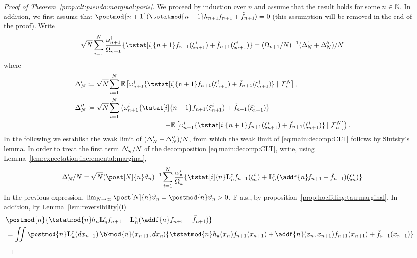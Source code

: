 \begin{proof}[Proof of Theorem~\ref{prop:clt:pseudo:marginal:paris}]
We proceed by induction over $n$ and assume that the result holds for some $n \in \mathbb{N}$. In addition, we first assume that $\postmod{n + 1}(\tstatmod{n + 1} h_{n + 1} f_{n + 1} + \ftd{n + 1}) = 0$ (this assumption will be removed in the end of the proof). Write
\begin{equation} \label{eq:main:decomp:CLT}
\sqrt{N} \sum_{i = 1}^\N \frac{\ewght{n + 1}{i}}{\sumwght{n + 1}}\{\tstat[i]{n + 1} f_{n + 1}(\epart{n + 1}{i}) +  \ftd{n + 1}(\epart{n + 1}{i})\} = (\sumwght{n + 1} / \N)^{-1} (\termprime + \termbis) / \N,
\end{equation}
where 
\begin{align*}
\termprime &\eqdef \sqrt{\N} \sum_{i = 1}^\N \pE \left[ \ewght{n + 1}{i}\{\tstat[i]{n + 1}f_{n + 1}(\epart{n + 1}{i}) + \ftd{n + 1}(\epart{n + 1}{i})\} \cond \calF{n}{\N} \right],\\
 \termbis &\eqdef \sqrt{\N} \sum_{i = 1}^N \left( \ewght{n+1}{i}\{\tstat[i]{n+1}f_{n+1}(\epart{n+1}{i}) + \ftd{n+1}(\epart{n+1}{i})\}\right.\\
&\left.\hspace{4cm} - \pE \left[\ewght{n+1}{i} \{ \tstat[i]{n+1} f_{n+1}(\epart{n+1}{i}) + \ftd{n+1}(\epart{n+1}{i})\} \cond \calF{n}{\N} \right] \right).
\end{align*}
In the following we establish the weak limit of $(\Delta_N^\prime + \Delta_N^{\prime \prime}) / N$, from which the weak limit of \eqref{eq:main:decomp:CLT} follows by Slutsky's lemma. In order to treat the first term $\Delta_N^\prime / N$ of the decomposition \eqref{eq:main:decomp:CLT}, write, using Lemma~\ref{lem:expectation:incremental:marginal},
\[
\termprime / \N = \sqrt{\N} (\post[\N]{n} \adjfuncforward{n})^{-1} \sum_{i = 1}^N \frac{\ewght{n}{i}}{\sumwght{n}} \{ \tstat[i]{n} \ukmod{n} f_{n + 1}(\epart{n}{i}) + \ukmod{n}(\addf{n} f_{n + 1} + \ftd{n + 1})(\epart{n}{i}) \}.
\]
In the previous expression, $\lim_{\N \to \infty} \post[\N]{n} \adjfuncforward{n} = \postmod{n} \adjfuncforward{n} > 0$, $\mathbb{P}$-a.s., by proposition~\ref{prop:hoeffding:tau:marginal}. In addition, by Lemma~\ref{lem:reversibility}(i), 
\begin{align*}
\lefteqn{\postmod{n} \{ \tstatmod{n} h_n \ukmod{n} f_{n + 1} + \ukmod{n}(\addf{n} f_{n + 1} + \ftd{n + 1}) \}} \\
&= \iint \postmod{n} \ukmod{n}(\rmd x_{n + 1}) \, \bkmod{n}(x_{n + 1}, \rmd x_n) \{ \tstatmod{n} h_n(x_n) f_{n + 1}(x_{n + 1}) + \addf{n}(x_n, x_{n + 1}) f_{n + 1}(x_{n + 1}) + \ftd{n + 1}(x_{n + 1}) \} \\

\end{align*}
\end{proof}
